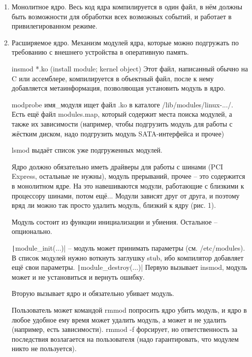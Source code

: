 \documentclass[a4paper,10pt]{article}
\newcommand{\ci}{\texttt}
\begin{document}
\begin{enumerate}
\item Монолитное ядро. Весь код ядра компилируется в один файл, в нём должны быть возможности для обработки всех возможных событий, и работает в привилегированном режиме.
\item Расширяемое ядро. Механизм модулей ядра, которые можно подгружать по требованию с внешнего устройства в оперативную память.

insmod *.ko (install module; kernel object)
Этот файл, написанный обычно на C или ассемблере, компилируется в объектный файл, после к нему добавляется метаинформация, позволяющая установить модуль в ядро.

modprobe имя\_модуля ищет файл .ko в каталоге /lib/modules/linux-.../. Есть ещё файл modules.map, который содержит места поиска модулей, а также их зависимости (например, чтобы подгрузить модуль для работы с жёстким диском, надо подгрузить модуль SATA-интерфейса и прочее)

lsmod выдаёт список уже подгруженных модулей.

Ядро должно обязательно иметь драйверы для работы с шинами (PCI Express, остальные не нужны), модуль прерываний, прочее -- это содержится в монолитном ядре. На это навешиваются модули, работающие с близкими к процессору шинами, потом ещё... Модули зависят друг от друга, и поэтому вряд ли можно так просто удалить модуль, близкий к ядру (рис. 1).

Модуль состоит из функции инициализации и убиения. Остальное -- опционально.

\ci|module_init(...)| -- модуль может принимать параметры (см. /etc/modules).
В список модулей нужно воткнуть заглушку stub, ибо компилятор добавляет ещё свои параметры.
\ci|module_destroy(...)|
Первую вызывает insmod, модуль может и не установиться и вернуть ошибку.

Вторую вызывает ядро и обязательно убивает модуль. 

Пользователь может командой rmmod попросить ядро убить модуль, и ядро в любое удобное ему время может удалить модуль, а может и не удалить (например, есть зависимости). rmmod -f форсирует, но ответственность за последствия возлагается на пользователя (надо гарантировать, что модулем никто не пользуется).


\end{enumerate}
\end{document}
